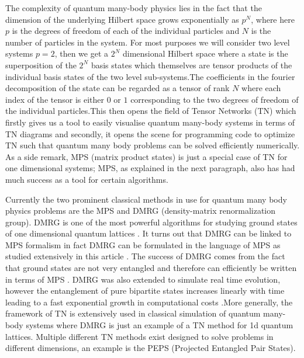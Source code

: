 \documentclass{physics_article}
\begin{document}
	The complexity of quantum many-body physics lies in the fact that the dimension of the underlying Hilbert space grows exponentially as $p^N$, where here $p$ is the degrees of freedom of each of the individual particles and $N$ is the number of particles in the system. For most purposes we will consider two level systems $p = 2$, then we get a $2^N$ dimensional Hilbert space where a state is the superposition of the $2^N$ basis states which themselves are tensor products of the individual basis states of the two level sub-systems.The coefficients in the fourier decomposition of the state can be regarded as a tensor of rank $N$ where each index of the tensor is either $0$ or $1$ corresponding to the two degrees of freedom of the individual particles.This then opens the field of Tensor Networks (TN) \cite{orus_2014} which firstly gives us a tool to easily visualise quantum many-body systems in terms of TN diagrams and secondly, it opens the scene for programming code to optimize TN such that quantum many body problems can be solved efficiently numerically. As a side remark, MPS (matrix product states) is just a special case of TN for one dimensional systems; MPS, as explained in the next paragraph, also has had much success as a tool for certain algorithms.

	Currently the two prominent classical methods in use for quantum many body physics problems are the MPS and DMRG (density-matrix renormalization group). DMRG is one of the most powerful algorithms for studying ground states of one dimensional quantum lattices \cite{schollwock_2005,hallberg_2006}. It turns out that DMRG can be linked to MPS formalism \cite{https://doi.org/10.48550/arxiv.quant-ph/0608197} in fact DMRG can be formulated in the language of MPS as studied extensively in this article \cite{schollwock_2011}. The success of DMRG comes from the fact that ground states are not very entangled and therefore can efficiently be written in terms of MPS \cite{10.21468/SciPostPhysLectNotes.5}. DMRG was also extended to simulate real time evolution, however the entanglement of pure bipartite states increases linearly with time leading to a fast exponential growth in computational costs \cite{10.21468/SciPostPhysLectNotes.5}.More generally, the framework of TN is extensively used in classical simulation of quantum many-body systems where DMRG is just an example of a TN method for 1d quantum lattices. Multiple different TN methods exist designed to solve problems in different dimensions, an example is the PEPS (Projected Entangled Pair States)\cite{orus_2014}. 
\end{document}
